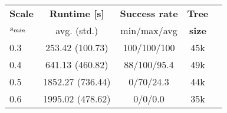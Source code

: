\begin{tabular}{lcccc}
\toprule
{\bf Scale} & {\bf Runtime [s] } & {\bf Success rate} & {\bf Tree}\\ 
{$s_{min}$ }  & avg. (std.)       & min/max/avg & {\bf size } \\ 
\midrule
0.3 & 253.42 (100.73) & 100/100/100 & 45k  \\
0.4 & 641.13 (460.82) & 88/100/95.4 & 49k  \\
0.5 & 1852.27 (736.44) & 0/70/24.3 & 44k  \\
0.6 & 1995.02 (478.62) & 0/0/0.0 & 35k  \\
\bottomrule
\end{tabular}
